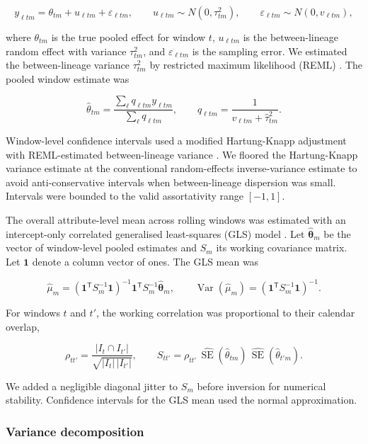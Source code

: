 \[
	y_{\ell tm}=\theta_{tm}+u_{\ell tm}+\varepsilon_{\ell tm},
	\qquad
	u_{\ell tm}\sim N(0,\tau^2_{tm}),
	\qquad
	\varepsilon_{\ell tm}\sim N(0,v_{\ell tm}),
\]

where $\theta_{tm}$ is the true pooled effect for window $t$, $u_{\ell tm}$ is the between-lineage random effect with variance $\tau^2_{tm}$, and $\varepsilon_{\ell tm}$ is the sampling error. We estimated the between-lineage variance $\tau^2_{tm}$ by restricted maximum likelihood (REML) \citep{Maestrini2026}. The pooled window estimate was

\[
	\hat\theta_{tm}
	=
	\frac{\sum_{\ell} q_{\ell tm} y_{\ell tm}}
	{\sum_{\ell} q_{\ell tm}},
	\qquad
	q_{\ell tm}=\frac{1}{v_{\ell tm}+\hat\tau^2_{tm}}.
\]

Window-level confidence intervals used a modified Hartung-Knapp adjustment with REML-estimated between-lineage variance \citep{Hartung2001}. We floored the Hartung-Knapp variance estimate at the conventional random-effects inverse-variance estimate to avoid anti-conservative intervals when between-lineage dispersion was small. Intervals were bounded to the valid assortativity range $[-1,1]$.

The overall attribute-level mean across rolling windows was estimated with an intercept-only correlated generalised least-squares (GLS) model \citep{Aitken1936}. Let $\hat{\boldsymbol\theta}_m$ be the vector of window-level pooled estimates and $S_m$ its working covariance matrix. Let $\mathbf{1}$ denote a column vector of ones. The GLS mean was

\[
	\hat\mu_m
	=
	\left(\mathbf{1}^{\mathsf T}S_m^{-1}\mathbf{1}\right)^{-1} %
	\mathbf{1}^{\mathsf T}S_m^{-1}\hat{\boldsymbol\theta}_m,
	\qquad
	\operatorname{Var}(\hat\mu_m)
	=
	\left(\mathbf{1}^{\mathsf T}S_m^{-1}\mathbf{1}\right)^{-1}. %
\]

For windows $t$ and $t'$, the working correlation was proportional to their calendar overlap,

\[
	\rho_{tt'}
	=
	\frac{|I_t\cap I_{t'}|}
	{\sqrt{|I_t|\,|I_{t'}|}},
	\qquad
	S_{tt'}=\rho_{tt'}\,\widehat{\operatorname{SE}}(\hat\theta_{tm})\,
	\widehat{\operatorname{SE}}(\hat\theta_{t'm}).
\]

We added a negligible diagonal jitter to $S_m$ before inversion for numerical stability. Confidence intervals for the GLS mean used the normal approximation.

\subsubsection{Variance decomposition}

